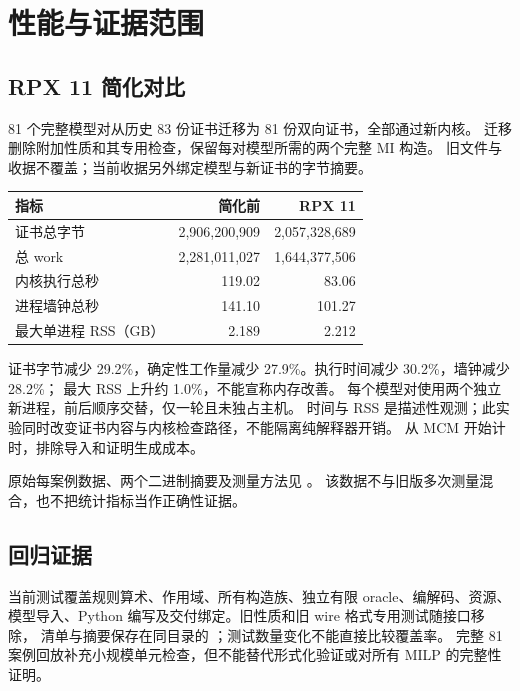 \chapter{性能与证据范围}
\label{ch:performance}

\section{RPX 11 简化对比}
81 个完整模型对从历史 83 份证书迁移为 81 份双向证书，全部通过新内核。
迁移删除附加性质和其专用检查，保留每对模型所需的两个完整 MI 构造。
旧文件与收据不覆盖；当前收据另外绑定模型与新证书的字节摘要。

\begin{center}
\begin{tabular}{lrr}
\toprule 指标 & 简化前 & RPX 11\\\midrule
证书总字节 & 2,906,200,909 & 2,057,328,689\\
总 work & 2,281,011,027 & 1,644,377,506\\
内核执行总秒 & 119.02 & 83.06\\
进程墙钟总秒 & 141.10 & 101.27\\
最大单进程 RSS（GB） & 2.189 & 2.212\\
\bottomrule
\end{tabular}
\end{center}
证书字节减少 29.2\%，确定性工作量减少 27.9\%。执行时间减少 30.2\%，墙钟减少 28.2\%；
最大 RSS 上升约 1.0\%，不能宣称内存改善。
每个模型对使用两个独立新进程，前后顺序交替，仅一轮且未独占主机。
时间与 RSS 是描述性观测；此实验同时改变证书内容与内核检查路径，不能隔离纯解释器开销。
从 MCM 开始计时，排除导入和证明生成成本。

原始每案例数据、两个二进制摘要及测量方法见
。
该数据不与旧版多次测量混合，也不把统计指标当作正确性证据。

\section{回归证据}
当前测试覆盖规则算术、作用域、所有构造族、独立有限 oracle、编解码、资源、
模型导入、Python 编写及交付绑定。旧性质和旧 wire 格式专用测试随接口移除，
清单与摘要保存在同目录的 ；测试数量变化不能直接比较覆盖率。
完整 81 案例回放补充小规模单元检查，但不能替代形式化验证或对所有 MILP 的完整性证明。

